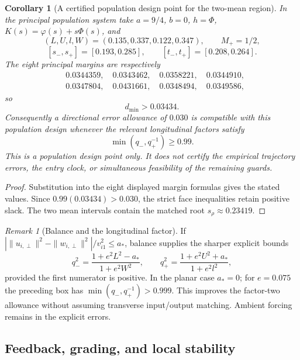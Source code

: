 \documentclass{article} %
\theoremstyle{plain}
\newtheorem{corollary}[theorem]{Corollary}
\theoremstyle{definition}
\theoremstyle{remark}
\newtheorem{remark}[theorem]{Remark}
\begin{document}
\begin{corollary}[A certified population design point for the two-mean region]
\label{sbemp:design}
In the principal population system take
$a=9/4$, $b=0$, $h=\Phi$, $K(s)=\varphi(s)+s\Phi(s)$, and
\[
 (L,U,l,W)=(0.135,0.337,0.122,0.347),\qquad M_+=1/2,
\]
\[
 [s_-,s_+]=[0.193,0.285],\qquad [t_-,t_+]=[0.208,0.264].
\]
The eight principal margins are respectively
\[
\begin{split}
&0.0344359,\quad0.0343462,\quad0.0358221,\quad0.0344910,\\
&0.0347804,\quad0.0431661,\quad0.0348494,\quad0.0349586,
\end{split}
\]
so
\[
 \boxed{d_{\min}>0.03434.}
\]
Consequently a directional error allowance of $0.030$ is compatible with
this population design whenever the relevant longitudinal factors satisfy
\[
 \min(q_-,q_+^{-1})\ge0.99.
\]
This is a population design point only.  It does not certify the empirical
trajectory errors, the entry clock, or simultaneous feasibility of the
remaining guards.
\end{corollary}
\begin{proof}
Substitution into the eight displayed margin formulas gives the stated
values.  Since $0.99(0.03434)>0.030$, the strict face inequalities retain
positive slack.  The two mean intervals contain the matched root
$s_\rho\approx0.23419$.
\end{proof}

\begin{remark}[Balance and the longitudinal factor]
If
$|\|u_{i,\perp}\|^2-\|w_{i,\perp}\|^2|/v_{i1}^2\le a_*$,
balance supplies the sharper explicit bounds
\[
 q_-^2=\frac{1+e^2L^2-a_*}{1+e^2W^2},\qquad
 q_+^2=\frac{1+e^2U^2+a_*}{1+e^2l^2},
\]
provided the first numerator is positive. In the planar case $a_*=0$;
for $e=0.075$ the preceding box has
$\min(q_-,q_+^{-1})>0.999$.
This improves the factor-two allowance without assuming transverse
input/output matching. Ambient forcing remains in the explicit errors.
\end{remark}

\subsection{Feedback, grading, and local stability}
\end{document}
